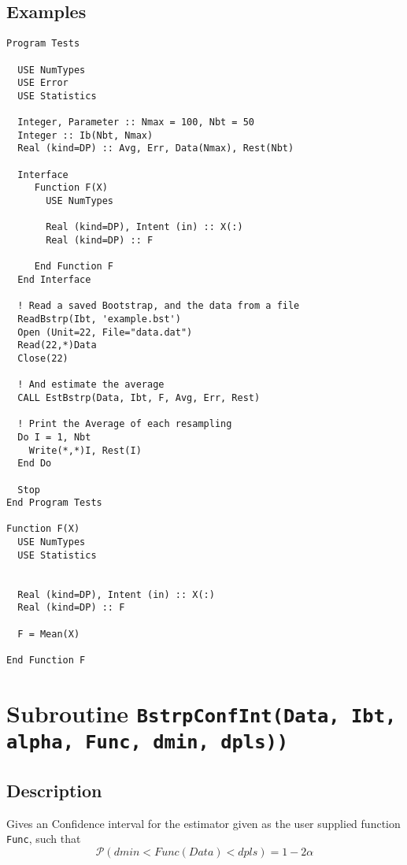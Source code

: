 \subsection{Examples}

\begin{lstlisting}[emph=EstBstrp,
                   emphstyle=\color{blue},
                   frame=trBL,
                   caption=Estimating the average.,
                   label=EstBstrp]
Program Tests

  USE NumTypes
  USE Error
  USE Statistics

  Integer, Parameter :: Nmax = 100, Nbt = 50
  Integer :: Ib(Nbt, Nmax)
  Real (kind=DP) :: Avg, Err, Data(Nmax), Rest(Nbt)

  Interface 
     Function F(X)
       USE NumTypes
         
       Real (kind=DP), Intent (in) :: X(:)
       Real (kind=DP) :: F

     End Function F
  End Interface

  ! Read a saved Bootstrap, and the data from a file
  ReadBstrp(Ibt, 'example.bst')
  Open (Unit=22, File="data.dat")
  Read(22,*)Data
  Close(22)

  ! And estimate the average
  CALL EstBstrp(Data, Ibt, F, Avg, Err, Rest)

  ! Print the Average of each resampling
  Do I = 1, Nbt
    Write(*,*)I, Rest(I)
  End Do

  Stop
End Program Tests

Function F(X)
  USE NumTypes
  USE Statistics
         

  Real (kind=DP), Intent (in) :: X(:)
  Real (kind=DP) :: F

  F = Mean(X)

End Function F

\end{lstlisting}


\section{Subroutine \texttt{BstrpConfInt(Data, Ibt, alpha, Func, dmin, dpls))}}

\subsection{Description}

Gives an Confidence interval for the estimator given as the user
supplied function \texttt{Func}, such that
\begin{displaymath}
  \mathcal P(dmin<Func(Data)<dpls) = 1-2\alpha
\end{displaymath}

